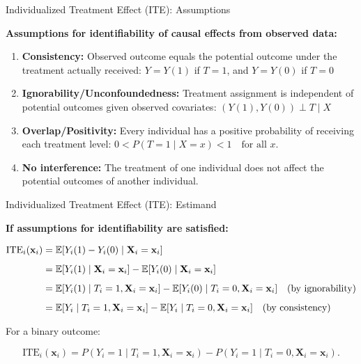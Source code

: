 \documentclass[onlytextwidth,english]{beamer}\usepackage[]{graphicx}\usepackage[]{xcolor}
\begin{document}
\begin{frame}{Individualized Treatment Effect (ITE): Assumptions}


\textbf{Assumptions for identifiability of causal effects from observed data:}

\begin{enumerate}
    \item \textbf{Consistency:} Observed outcome equals the potential outcome under the treatment actually received: $Y = Y(1)$ if $T = 1$, and $Y = Y(0)$ if $T = 0$
    \item \textbf{Ignorability/Unconfoundedness:} Treatment assignment is independent of potential outcomes given observed covariates: $(Y(1), Y(0)) \perp T \mid X$
    \item \textbf{Overlap/Positivity:} Every individual has a positive probability of receiving each treatment level: $0 < P(T = 1 \mid X = x) < 1 \quad \text{for all } x.$
    \item \textbf{No interference:} The treatment of one individual does not affect the potential outcomes of another individual.
\end{enumerate}

\end{frame}


\begin{frame}{Individualized Treatment Effect (ITE): Estimand}


\textbf{If assumptions for identifiability are satisfied:}

\begin{align}
\text{ITE}_i(\mathbf{x}_i) &= \mathbb{E}[Y_i(1) - Y_i(0) \mid \mathbf{X}_i = \mathbf{x}_i] \notag \\[0.5em]
&= \mathbb{E}[Y_i(1) \mid \mathbf{X}_i = \mathbf{x}_i] - \mathbb{E}[Y_i(0) \mid \mathbf{X}_i = \mathbf{x}_i] \notag \\[0.5em]
&= \mathbb{E}[Y_i(1) \mid T_i = 1, \mathbf{X}_i = \mathbf{x}_i]
 - \mathbb{E}[Y_i(0) \mid T_i = 0, \mathbf{X}_i = \mathbf{x}_i] \quad \text{(by ignorability)} \notag \\[0.5em]
&= \mathbb{E}[Y_i \mid T_i = 1, \mathbf{X}_i = \mathbf{x}_i]
 - \mathbb{E}[Y_i \mid T_i = 0, \mathbf{X}_i = \mathbf{x}_i] \quad \text{(by consistency)}
\end{align}


For a binary outcome:

\begin{equation}
\text{ITE}_i(\mathbf{x}_i) = P(Y_i = 1 \mid T_i = 1, \mathbf{X}_i = \mathbf{x}_i) - P(Y_i = 1 \mid T_i = 0, \mathbf{X}_i = \mathbf{x}_i).
\end{equation}

\end{frame}
\end{document}
